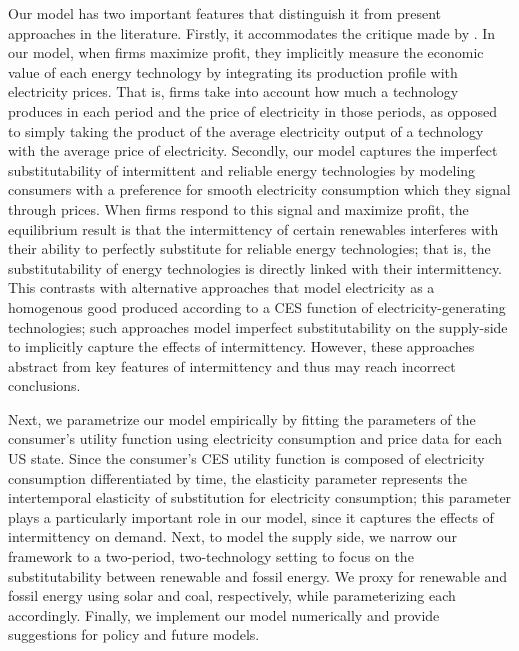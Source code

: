 \documentclass[11pt,a4paper,leqno]{extarticle}
\begin{document}
	Our model has two important features that distinguish it from present approaches in the literature. Firstly, it accommodates the critique made by \citet{Joskow2011}. In our model, when firms maximize profit, they implicitly measure the economic value of each energy technology by integrating its production profile with electricity prices. That is, firms take into account how much a technology produces in each period and the price of electricity in those periods, as opposed to simply taking the product of the average electricity output of a technology with the average price of electricity. Secondly, our model captures the imperfect substitutability of intermittent and reliable energy technologies  by modeling consumers with a preference for smooth electricity consumption which they signal through prices. When firms respond to this signal and maximize profit, the equilibrium result  is that the intermittency of certain renewables interferes with their ability to perfectly substitute for reliable energy technologies; that is, the substitutability of energy technologies is directly linked with their intermittency.
	This contrasts with alternative approaches that model electricity as a homogenous good produced according to  a CES function of electricity-generating technologies; such approaches model imperfect substitutability on the supply-side to implicitly capture the effects of intermittency. However, these approaches abstract from key features of intermittency and thus may reach incorrect conclusions. 
	
	Next, we parametrize our model empirically by fitting the parameters of the consumer's utility function using electricity consumption and price data for each US state. Since the consumer's CES utility function is composed of electricity consumption differentiated by time, the elasticity parameter represents the intertemporal elasticity of substitution for electricity consumption; this parameter plays a particularly important role in our model, since it captures the effects of intermittency on demand. Next, to model the supply side, we narrow our framework to a two-period, two-technology setting to focus on the substitutability between renewable and fossil energy. We proxy for renewable and fossil energy using solar and coal, respectively, while parameterizing each accordingly. Finally, we implement our model numerically and provide suggestions for policy and future models. 
	
\end{document}
